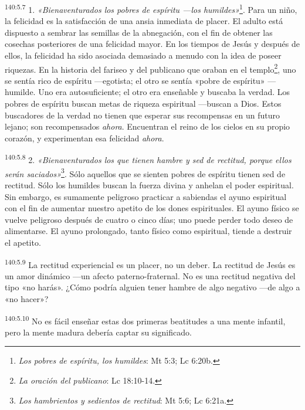 \par
\textsuperscript{140:5.7} 1. \textit{«Bienaventurados los pobres de espíritu ---los humildes»}\footnote{\textit{Los pobres de espíritu, los humildes}: Mt 5:3; Lc 6:20b.}. Para un niño, la felicidad es la satisfacción de una ansia inmediata de placer. El adulto está dispuesto a sembrar las semillas de la abnegación, con el fin de obtener las cosechas posteriores de una felicidad mayor. En los tiempos de Jesús y después de ellos, la felicidad ha sido asociada demasiado a menudo con la idea de poseer riquezas. En la historia del fariseo y del publicano que oraban en el templo\footnote{\textit{La oración del publicano}: Lc 18:10-14.}, uno se sentía rico de espíritu ---egotista; el otro se sentía «pobre de espíritu» ---humilde. Uno era autosuficiente; el otro era enseñable y buscaba la verdad. Los pobres de espíritu buscan metas de riqueza espiritual ---buscan a Dios. Estos buscadores de la verdad no tienen que esperar sus recompensas en un futuro lejano; son recompensados \textit{ahora}. Encuentran el reino de los cielos en su propio corazón, y experimentan esa felicidad \textit{ahora}.

\par
\textsuperscript{140:5.8} 2. \textit{«Bienaventurados los que tienen hambre y sed de rectitud, porque ellos serán saciados»}\footnote{\textit{Los hambrientos y sedientos de rectitud}: Mt 5:6; Lc 6:21a.}. Sólo aquellos que se sienten pobres de espíritu tienen sed de rectitud. Sólo los humildes buscan la fuerza divina y anhelan el poder espiritual. Sin embargo, es sumamente peligroso practicar a sabiendas el ayuno espiritual con el fin de aumentar nuestro apetito de los dones espirituales. El ayuno físico se vuelve peligroso después de cuatro o cinco días; uno puede perder todo deseo de alimentarse. El ayuno prolongado, tanto físico como espiritual, tiende a destruir el apetito.

\par
\textsuperscript{140:5.9} La rectitud experiencial es un placer, no un deber. La rectitud de Jesús es un amor dinámico ---un afecto paterno-fraternal. No es una rectitud negativa del tipo «no harás». ¿Cómo podría alguien tener hambre de algo negativo ---de algo a «no hacer»?

\par
\textsuperscript{140:5.10} No es fácil enseñar estas dos primeras beatitudes a una mente infantil, pero la mente madura debería captar su significado.

